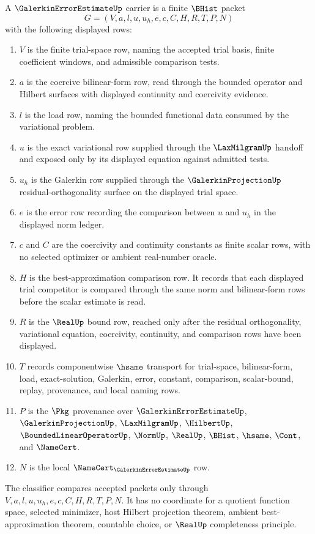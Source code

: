 \begin{definition}
\label{def:galerkin-error-estimate-carrier}
A $\GalerkinErrorEstimateUp$ carrier is a finite $\BHist$ packet
$$
G=(V,a,l,u,u_h,e,c,C,H,R,T,P,N)
$$
with the following displayed rows:
\begin{enumerate}
\item $V$ is the finite trial-space row, naming the accepted trial basis, finite coefficient windows, and admissible comparison tests.
\item $a$ is the coercive bilinear-form row, read through the bounded operator and Hilbert surfaces with displayed continuity and coercivity evidence.
\item $l$ is the load row, naming the bounded functional data consumed by the variational problem.
\item $u$ is the exact variational row supplied through the $\LaxMilgramUp$ handoff and exposed only by its displayed equation against admitted tests.
\item $u_h$ is the Galerkin row supplied through the $\GalerkinProjectionUp$ residual-orthogonality surface on the displayed trial space.
\item $e$ is the error row recording the comparison between $u$ and $u_h$ in the displayed norm ledger.
\item $c$ and $C$ are the coercivity and continuity constants as finite scalar rows, with no selected optimizer or ambient real-number oracle.
\item $H$ is the best-approximation comparison row. It records that each displayed trial competitor is compared through the same norm and bilinear-form rows before the scalar estimate is read.
\item $R$ is the $\RealUp$ bound row, reached only after the residual orthogonality, variational equation, coercivity, continuity, and comparison rows have been displayed.
\item $T$ records componentwise $\hsame$ transport for trial-space, bilinear-form, load, exact-solution, Galerkin, error, constant, comparison, scalar-bound, replay, provenance, and local naming rows.
\item $P$ is the $\Pkg$ provenance over $\GalerkinErrorEstimateUp$, $\GalerkinProjectionUp$, $\LaxMilgramUp$, $\HilbertUp$, $\BoundedLinearOperatorUp$, $\NormUp$, $\RealUp$, $\BHist$, $\hsame$, $\Cont$, and $\NameCert$.
\item $N$ is the local $\NameCert_{\GalerkinErrorEstimateUp}$ row.
\end{enumerate}
The classifier compares accepted packets only through $V,a,l,u,u_h,e,c,C,H,R,T,P,N$. It has no coordinate for a quotient function space, selected minimizer, host Hilbert projection theorem, ambient best-approximation theorem, countable choice, or $\RealUp$ completeness principle.
\end{definition}

